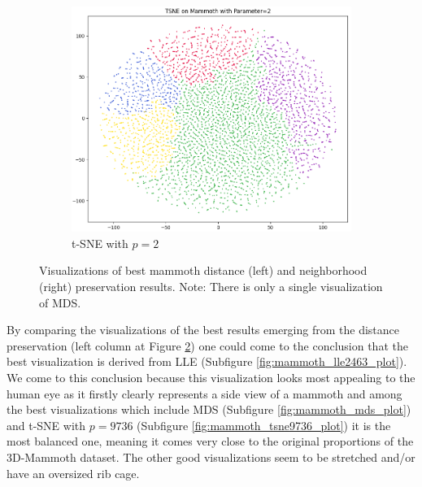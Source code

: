\begin{figure}[!]
\begin{subfigure}[t]{0.49\columnwidth}
    \end{subfigure}
     \hfill
     \begin{subfigure}[t]{0.49\columnwidth}
    	\centering
    	\includegraphics[width=\columnwidth]{images/mammoth_tsne2_plot.png}
    	\caption{t-SNE with $p=2$}
        \label{fig:mammoth_tsne2_plot}
    \end{subfigure}
     \caption[3D-Mammoth Visualisations of Best Results]{Visualizations of best mammoth distance (left) and neighborhood (right) preservation results. Note: There is only a single visualization of MDS.}
    \label{fig:mammoth_visual_best}
\end{figure}

By comparing the visualizations of the best results emerging from the distance preservation (left column at Figure \ref{fig:mammoth_visual_best}) one could come to the conclusion that the best visualization is derived from LLE (Subfigure \ref{fig:mammoth_lle2463_plot}). We come to this conclusion because this visualization looks most appealing to the human eye as it firstly clearly represents a side view of a mammoth and among the best visualizations which include MDS (Subfigure \ref{fig:mammoth_mds_plot}) and t-SNE with $p=9736$ (Subfigure \ref{fig:mammoth_tsne9736_plot}) it is the most balanced one, meaning it comes very close to the original proportions of the 3D-Mammoth dataset. The other good visualizations seem to be stretched and/or have an oversized rib cage.

